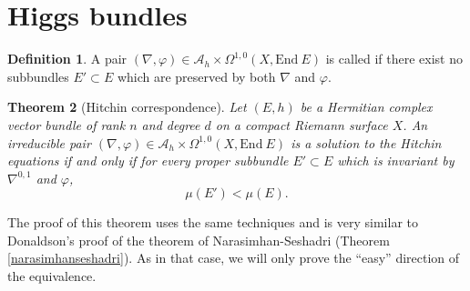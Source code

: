 \documentclass[12pt,a4paper]{book}
\newtheorem{thm}{Theorem}[section]
\theoremstyle{definition} \newtheorem{defn}[thm]{Definition}
\theoremstyle{definition} \newtheorem{ejemplo}[thm]{Example}
\theoremstyle{remark} \newtheorem{rem}[thm]{Remark}
\def\AA{\mathscr{A}}
\def\End{\mathrm{End}}
\let\emph\relax
\begin{document}
	  \section{Higgs bundles}
	  \begin{defn}
	    A pair $(\nabla,\varphi) \in \AA_h \times \Omega^{1,0}(X,\End\ E)$ is called \emph{irreducible} if there exist no subbundles $E'\subset E$ which are preserved by both $\nabla$ and $\varphi$. 
	  \end{defn}
	  \begin{thm}[Hitchin correspondence] \label{Hitchin correspondence}
	    Let $(E,h)$ be a Hermitian complex vector bundle of rank $n$ and degree $d$ on a compact Riemann surface $X$.
	    An irreducible pair $(\nabla ,\varphi) \in \AA_h \times \Omega^{1,0}(X,\End\ E)$ is a solution to the Hitchin equations if and only if for every proper subbundle $E'\subset E$ which is invariant by $\nabla^{0,1}$ and $\varphi$,
	    \begin{equation*}
	      \mu(E')<\mu(E).
	    \end{equation*}
	  \end{thm}
	  The proof of this theorem uses the same techniques and is very similar to Donaldson's proof of the theorem of Narasimhan-Seshadri (Theorem \ref{narasimhanseshadri}). As in that case, we will only prove the ``easy'' direction of the equivalence.
\end{document}
